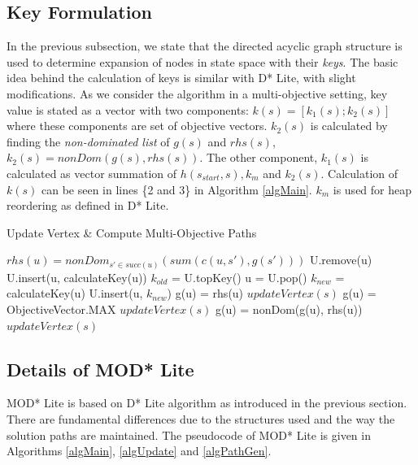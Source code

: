 \documentclass[10pt, a4paper, conference, compsocconf]{IEEEtran}
\begin{document}
\subsection{Key Formulation}
In the previous subsection, we state that the directed acyclic graph structure is used to determine expansion of nodes in state space with their \textit{keys}. The basic idea behind the calculation of keys is similar with D* Lite, with slight modifications. As we consider the algorithm in a multi-objective setting, key value is stated as a vector with two components: $k(s) = [k_{1}(s);k_{2}(s)]$ where these components are set of objective vectors. $k_{2}(s)$ is calculated by finding the \textit{non-dominated list} of $g(s)$ and $rhs(s)$, $k_{2}(s)= nonDom(g(s), rhs(s))$. The other component, $k_{1}(s)$  is calculated as vector summation of $h(s_{start}, s), k_{m}$ and $k_{2}(s)$. Calculation of $k(s)$ can be seen in lines \{2 and 3\} in Algorithm \ref{algMain}. $k_{m}$ is used for heap reordering as defined in  D* Lite.

\begin{algorithm}
	\caption{Update Vertex \& Compute Multi-Objective Paths}
	\label{algUpdate}
    \begin{algorithmic}[1]
   	  		\State $rhs(u) = nonDom_{s' \in succ(u)}(sum(c(u,s'), g(s')))$
   	  	\EndIf
   	  	 U.remove(u) \EndIf
   	  		\State U.insert(u, calculateKey(u))
   	  	\EndIf
   	  \EndFunction
    	  \Statex
			\State $k_{old}$ = U.topKey()
	      	\State u = U.pop()
	      	\State $k_{new}$ = calculateKey(u)
	      		\State U.insert(u, $k_{new}$)
	      		\State g(u) = rhs(u)
	      		 $updateVertex(s)$ \EndFor
	      		\State g(u) = ObjectiveVector.MAX
	      		 $updateVertex(s)$ \EndFor
	      	\Else
	      		\State g(u) = nonDom(g(u), rhs(u))
	      		 $updateVertex(s)$ \EndFor
	      	\EndIf
		\EndWhile
	  \EndFunction
	\end{algorithmic}
\end{algorithm}

\subsection{Details of MOD* Lite}
MOD* Lite is based on  D* Lite algorithm as introduced in the previous section. There are fundamental differences due to the structures used and the way the solution paths are maintained. The pseudocode of MOD* Lite is given in Algorithms \ref{algMain}, \ref{algUpdate} and \ref{algPathGen}.
\end{document}
